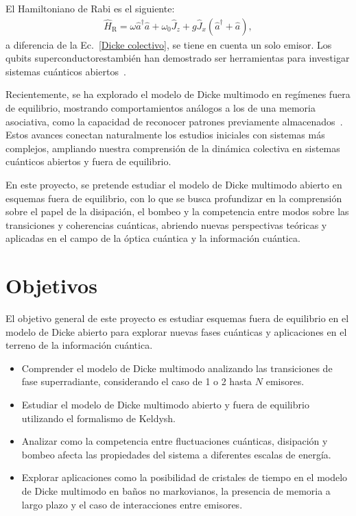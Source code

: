 \documentclass[onecolumn,notitlepage,letterpaper,aps,pra,12pt]{article}
\numberwithin{equation}{section}
\begin{document}
El Hamiltoniano de Rabi es el siguiente:
\begin{gather}
    \hat{H}_{\text{R}} = \omega\hat{a}^{\dagger}\hat{a} + \omega_{0}\hat{J}_{z} + g\hat{J}_{x}\left(\hat{a}^{\dagger} + \hat{a}\right),
\end{gather}
a diferencia de la Ec.~\ref{Dicke colectivo}, se tiene en cuenta un solo emisor. Los qubits superconductorestambién han demostrado ser herramientas para investigar sistemas cuánticos abiertos~\cite{hwang2018,Lo2021}.

Recientemente, se ha explorado el modelo de Dicke multimodo en regímenes fuera de equilibrio, mostrando comportamientos análogos a los de una memoria asociativa, como la capacidad de reconocer patrones previamente almacenados~\cite{fiorelli2020}. Estos avances conectan naturalmente los estudios iniciales con sistemas más complejos, ampliando nuestra comprensión de la dinámica colectiva en sistemas cuánticos abiertos y fuera de equilibrio.


En este proyecto, se pretende estudiar el modelo de Dicke multimodo abierto en esquemas fuera de equilibrio, con lo que se busca profundizar en la comprensión sobre el papel de la disipación, el bombeo y la competencia entre modos sobre las transiciones y coherencias cuánticas, abriendo nuevas perspectivas teóricas y aplicadas en el campo de la óptica cuántica y la información cuántica. 


\section{Objetivos}

El objetivo general de este proyecto es estudiar esquemas fuera de equilibrio en el modelo de Dicke abierto para explorar nuevas fases cuánticas y aplicaciones en el terreno de la información cuántica. 

\begin{itemize}
    \item Comprender el modelo de Dicke multimodo analizando las transiciones de fase superradiante, considerando el caso de 1 o 2 hasta $N$ emisores.
    \item Estudiar el modelo de Dicke multimodo abierto y fuera de equilibrio utilizando el formalismo de Keldysh. 
    \item Analizar como la competencia entre fluctuaciones cuánticas, disipación y bombeo afecta las propiedades del sistema a diferentes escalas de energía. 
    \item Explorar aplicaciones como la posibilidad de cristales de tiempo en el modelo de Dicke multimodo en baños no markovianos, la presencia de memoria a largo plazo y el caso de interacciones entre emisores. 
\end{itemize}
\end{document}

